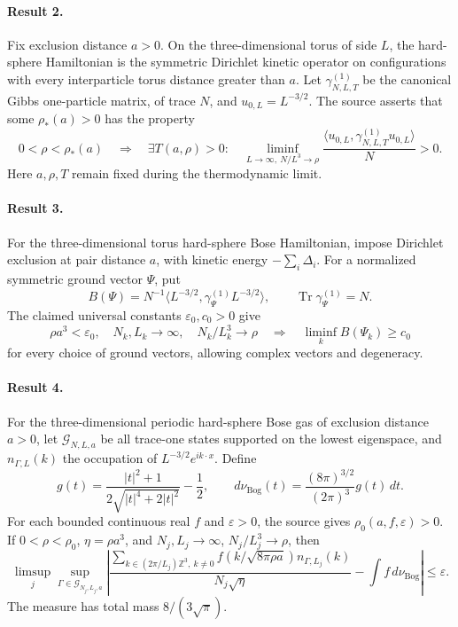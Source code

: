 \documentclass[11pt]{article}
\begin{document}
\paragraph{Result 2.} Fix exclusion distance \(a>0\). On the three-dimensional torus of side \(L\), the hard-sphere Hamiltonian is the symmetric Dirichlet kinetic operator on configurations with every interparticle torus distance greater than \(a\). Let \(\gamma^{(1)}_{N,L,T}\) be the canonical Gibbs one-particle matrix, of trace \(N\), and \(u_{0,L}=L^{-3/2}\). The source asserts that some \(\rho_*(a)>0\) has the property
\[
 0<\rho<\rho_*(a)\quad\Longrightarrow\quad
 \exists T(a,\rho)>0:\quad
 \liminf_{L\to\infty,\ N/L^3\to\rho}
 \frac{\langle u_{0,L},\gamma^{(1)}_{N,L,T}u_{0,L}\rangle}{N}>0.
\]
Here \(a,\rho,T\) remain fixed during the thermodynamic limit.

\paragraph{Result 3.} For the three-dimensional torus hard-sphere Bose Hamiltonian, impose Dirichlet exclusion at pair distance \(a\), with kinetic energy \(-\sum_i\Delta_i\). For a normalized symmetric ground vector \(\Psi\), put
\[
 B(\Psi)=N^{-1}\langle L^{-3/2},\gamma^{(1)}_\Psi L^{-3/2}\rangle,
 \qquad\operatorname{Tr}\gamma^{(1)}_\Psi=N.
\]
The claimed universal constants \(\varepsilon_0,c_0>0\) give
\[
 \rho a^3<\varepsilon_0,\quad N_k,L_k\to\infty,\quad N_k/L_k^3\to\rho
 \quad\Longrightarrow\quad\liminf_k B(\Psi_k)\ge c_0
\]
for every choice of ground vectors, allowing complex vectors and degeneracy.

\paragraph{Result 4.} For the three-dimensional periodic hard-sphere Bose gas of exclusion distance \(a>0\), let \(\mathcal G_{N,L,a}\) be all trace-one states supported on the lowest eigenspace, and \(n_{\Gamma,L}(k)\) the occupation of \(L^{-3/2}e^{ik\cdot x}\). Define
\[
 g(t)=\frac{|t|^2+1}{2\sqrt{|t|^4+2|t|^2}}-\frac12,\qquad
 d\nu_{\mathrm{Bog}}(t)=\frac{(8\pi)^{3/2}}{(2\pi)^3}g(t)\,dt.
\]
For each bounded continuous real \(f\) and \(\varepsilon>0\), the source gives \(\rho_0(a,f,\varepsilon)>0\). If \(0<\rho<\rho_0\), \(\eta=\rho a^3\), and \(N_j,L_j\to\infty\), \(N_j/L_j^3\to\rho\), then
\[
 \limsup_j\sup_{\Gamma\in\mathcal G_{N_j,L_j,a}}
 \left|\frac{\sum_{k\in(2\pi/L_j)\mathbb Z^3,\ k\ne0}
 f(k/\sqrt{8\pi\rho a})n_{\Gamma,L_j}(k)}{N_j\sqrt\eta}
 -\int f\,d\nu_{\mathrm{Bog}}\right|\le\varepsilon.
\]
The measure has total mass \(8/(3\sqrt\pi)\).
\end{document}
